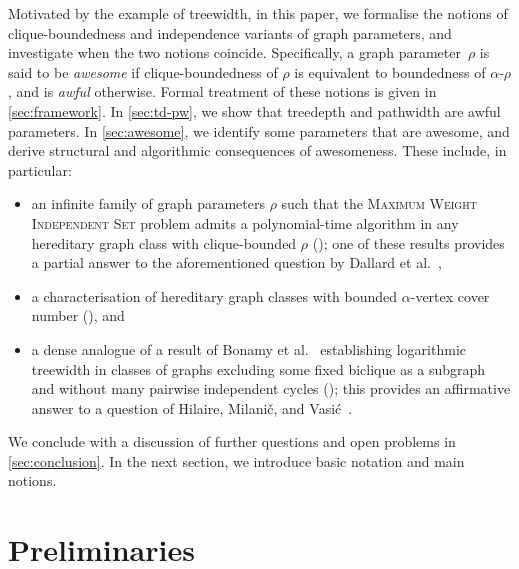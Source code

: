 \documentclass[11pt]{article}
\theoremstyle{plain}
\theoremstyle{definition}
\theoremstyle{remark}
\numberwithin{equation}{section}
\begin{document}
Motivated by the example of treewidth, in this paper, we formalise the notions of clique-boundedness and independence variants of graph parameters, and investigate when the two notions coincide.
Specifically, a graph parameter~$\rho$ is said to be \emph{awesome} if clique-boundedness of $\rho$ is equivalent to boundedness of $\alpha$-$\rho$, and is \emph{awful} otherwise.
Formal treatment of these notions is given in \cref{sec:framework}.
In \cref{sec:td-pw}, we show that treedepth and pathwidth are awful parameters. 
In \cref{sec:awesome}, we identify some parameters that are awesome, and derive structural and algorithmic consequences of awesomeness.
These include, in particular:
\begin{itemize}
    \item an infinite family of graph parameters $\rho$ such that the \textsc{Maximum Weight Independent Set} problem admits a polynomial-time algorithm in any hereditary graph class with clique-bounded $\rho$ (); one of these results provides a partial answer to the aforementioned question by Dallard et al.~\cite{dallard2022secondpaper},
    \item  a characterisation of hereditary graph classes with bounded $\alpha$-vertex cover number (), and 
    \item a dense analogue of a result of Bonamy et al.~\cite{MR4723425} establishing logarithmic treewidth in classes of graphs excluding some fixed biclique as a subgraph and without many pairwise independent cycles (); this provides an affirmative answer to a question of Hilaire, Milanič, and Vasić~\cite{HMV25}.
\end{itemize}
We conclude with a discussion of further questions and open problems in \cref{sec:conclusion}. 
In the next section, we introduce basic notation and main notions.

\section{Preliminaries}\label{sec:prelim}
\end{document}
